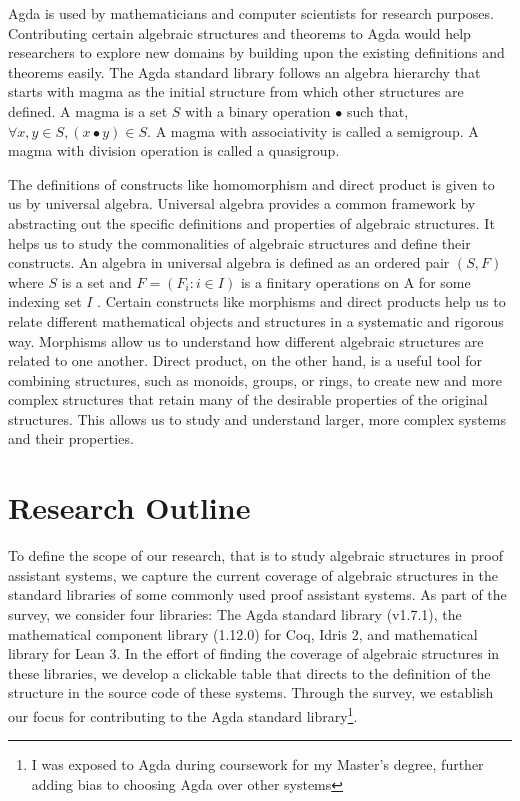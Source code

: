 Agda is used by mathematicians and computer scientists for research purposes.
Contributing certain algebraic structures and theorems to Agda would help
researchers to explore new domains by building upon the existing definitions and
theorems easily. The Agda standard library follows an algebra hierarchy that
starts with magma as the initial structure from which other structures are
defined. A magma is a set $S$ with a binary operation $∙$ such that, $\forall
x,y \in S, (x ∙ y) \in S$. A magma with associativity is called a semigroup. A
magma with division operation is called a quasigroup.

The definitions of constructs like homomorphism and direct product is given to
us by universal algebra. Universal algebra provides a common framework by
abstracting out the specific definitions and properties of algebraic structures.
It helps us to study the commonalities of algebraic structures and define their
constructs. An algebra in universal algebra is defined as an ordered pair
$(S,F)$ where $S$ is a set and $F = (F_i:i\in I)$ is a finitary operations on A
for some indexing set $I$ \cite{sannella2012foundations}. Certain constructs
like morphisms and direct products help us to relate different mathematical
objects and structures in a systematic and rigorous way. Morphisms
allow us to understand how different algebraic structures are related to one
another. Direct product, on the other hand, is a useful tool for combining
structures, such as monoids, groups, or rings, to create new and more
complex structures that retain many of the desirable properties of the original
structures. This allows us to study and understand larger, more complex systems
and their properties.

\section{Research Outline}
To define the scope of our research, that is to study algebraic structures in
proof assistant systems, we capture the current coverage of algebraic structures
in the standard libraries of some commonly used proof assistant systems. As part
of the survey, we consider four libraries: The Agda standard library (v1.7.1),
the mathematical component library (1.12.0) for Coq, Idris 2, and mathematical
library for Lean 3. In the effort of finding the coverage of algebraic
structures in these libraries, we develop a clickable table that directs to the
definition of the structure in the source code of these systems. Through the
survey, we establish our focus for contributing to the Agda standard
library\footnote{I was exposed to Agda during coursework for my Master's degree,
further adding bias to choosing Agda over other systems}.

